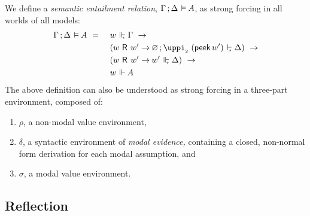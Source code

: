 \documentclass[submission,copyright,creativecommons,sharealike,backref=page]{eptcs}
\newcommand{\sA}{\mkern-2muA}
\newcommand{\R}{\mathrel{\rlap{$\mkern.75mu\textsf{R}$}\hphantom{\subseteq}}}
\renewcommand{\:}{\mathop{\mkern3mu:\mkern3mu}}
\renewcommand{\.}{\mathop{\mkern3mu.\mkern3mu}}
\renewcommand{\;}{\mathop{;}}
\renewcommand{\,}{\mathop{,}}
\newcommand{\es}{\mathrel{\mkern2mu\vdash_{\mkern-9mu\scriptscriptstyle{\star}}}}
\newcommand{\ee}{\mathrel{\mkern2mu\Vdash\mkern1mu}}
\newcommand{\ees}{\mathrel{\mkern2mu\Vdash_{\mkern-9mu\scriptscriptstyle{\star}}}}
\newcommand{\ef}{\mathrel{\mkern2mu\vDash\mkern1mu}}
\renewcommand{\r}{\mathrel{\rightarrow\mkern-1mu}}
\newcommand{\peek}{\operatorname{\textsf{peek}}}
\newcommand{\piii}{\operatorname{\uppi_{\scriptscriptstyle{2}}}}
\renewcommand{\O}{\varnothing}
\theoremstyle{mystyle}
\begin{document}
We define a \emph{semantic entailment relation}, $\Gamma \; \Delta \ef \sA$, as strong forcing in all worlds of all models:
\begin{alignat*}{2}
  & \Gamma \; \Delta \ef \sA ~=~ && w \ees \Gamma ~\r\\
  &                              && (w \R w' \r \O \; \piii~(\peek w') \es \Delta) ~\r\\
  &                              && (w \R w' \r w' \ees \Delta) ~\r\\
  &                              && w \ee \sA
\end{alignat*}
The above definition can also be understood as strong forcing in a three-part environment, composed of:
\begin{enumerate}
  \item $\rho$, a non-modal value environment,
  \item $\delta$, a syntactic environment of \emph{modal evidence,} containing a closed, non-normal form derivation for each modal assumption, and
  \item $\sigma$, a modal value environment.
\end{enumerate}


\subsection{Reflection}
\end{document}
